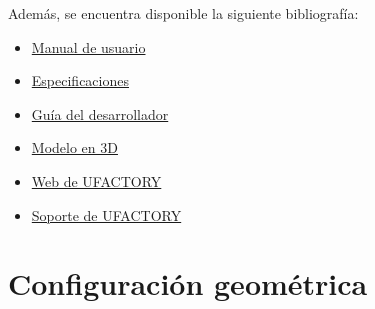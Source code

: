 \documentclass[a4paper,12pt]{article}
\begin{document}
Además, se encuentra disponible la siguiente bibliografía:
\begin{itemize}
    \item \href{https://github.com/UPM-Robotics/uarm/blob/master/docs/robot-information/uArm%20pro%20User%20Manual%20v1.1.0.pdf}{Manual de usuario}
    \item \href{https://github.com/UPM-Robotics/uarm/blob/master/docs/robot-information/uArm-Swift-Specifications-171012.pdf}{Especificaciones}
    \item \href{https://github.com/UPM-Robotics/uarm/blob/master/docs/robot-information/uArm%20Swift%20Pro_Developer%20Guide%20v1.0.6.pdf}{Guía del desarrollador}
    \item \href{https://github.com/UPM-Robotics/uarm/blob/master/docs/robot-information/uArm_Swift_Pro_3D_20180620.STEP}{Modelo en 3D}
    \item \href{https://www.ufactory.cc/#/en/}{Web de UFACTORY}
    \item \href{https://www.ufactory.cc/#/en/support/technology}{Soporte de UFACTORY}
\end{itemize}

\newpage
\section{Configuración geométrica}
\label{sec:dk}
\end{document}
